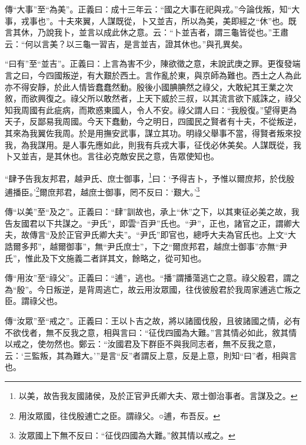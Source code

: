 {\noindent\zhuan{}\fzbyks 傳“大事”至“為美”。正義曰：成十三年云：“國之大事在祀與戎。”今論伐叛，知“大事，戎事也”。十夫來翼，人謀既從，卜又並吉，所以為美，美即經之“休”也。既言其休，乃說我卜，並言以成此休之意。云：“卜並吉者，謂三龜皆從也。”王肅云：“何以言美？以三龜一習吉，是言並吉，證其休也。”與孔異矣。 \par}

{\noindent\shu{}\fzkt “曰有”至“並吉”。正義曰：上言為害不少，陳欲徵之意，未說武庚之罪。更復發端言之曰，今四國叛逆，有大艱於西土。言作亂於東，與京師為難也。西土之人為此亦不得安靜，於此人情皆蠢蠢然動。殷後小國腆腆然之祿父，大敢紀其王業之次敘，而欲興復之。祿父所以敢然者，上天下威於三叔，以其流言欲下威誅之，祿父知我周國有此疵病，而欺惑東國人，令人不安。祿父謂人曰：“我殷復。”望得更為天子，反鄙易我周國。今天下蠢動，今之明日，四國民之賢者有十夫，不從叛逆，其來為我翼佐我周。於是用撫安武事，謀立其功。明祿父舉事不當，得賢者叛來投我，為我謀用。是人事先應如此，則我有兵戎大事，征伐必休美矣。人謀既從，我卜又並吉，是其休也。言往必克敵安民之意，告眾使知也。 \par}

“肆予告我友邦君，越尹氏、庶士御事，\footnote{以美，故告我友國諸侯，及於正官尹氏卿大夫、眾士御治事者。言謀及之。}曰：‘予得吉卜，予惟以爾庶邦，於伐殷逋播臣。’\footnote{用汝眾國，往伐殷逋亡之臣。謂祿父。○逋，布吾反。}爾庶邦君，越庶士御事，罔不反曰：‘艱大。’\footnote{汝眾國上下無不反曰：“征伐四國為大難。”敘其情以戒之。}


{\noindent\zhuan{}\fzbyks 傳“以美”至“及之”。正義曰：“肆”訓故也，承上“休”之下，以其東征必美之故，我告友國君以下共謀之。“尹氏”，即雲“百尹”氏也。“尹”，正也，諸官之正，謂卿大夫，故傳言“及於正官尹氏卿大夫”。“尹氏”即官也，總呼大夫為官氏也。上文“大誥爾多邦”，越爾御事”，無“尹氏庶士”，下之“爾庶邦君，越庶士御事”亦無“尹氏”，惟此及下文施義二者詳其文，餘略之，從可知也。 \par}

{\noindent\zhuan{}\fzbyks 傳“用汝”至“祿父”。正義曰：“逋”，逃也。“播”謂播蕩逃亡之意。祿父殷君，謂之為“殷”。今日叛逆，是背周逃亡，故云用汝眾國，往伐彼殷君於我周家逋逃亡叛之臣。謂祿父也。 \par}

{\noindent\zhuan{}\fzbyks 傳“汝眾”至“戒之”。正義曰：王以卜吉之故，將以諸國伐殷，且彼諸國之情，必有不欲伐者，無不反我之意，相與言曰：“征伐四國為大難。”言其情必如此，敘其情以戒之，使勿然也。鄭云：“汝國君及下群臣不與我同志者，無不反我之意，云：‘三監叛，其為難大。’”是言“反”者謂反上意，反是上意，則知“曰”者，相與言也。 \par}

